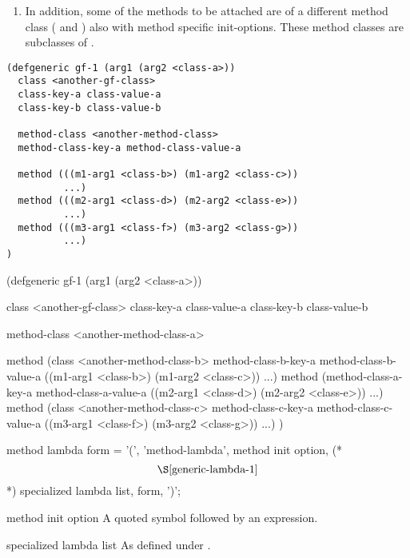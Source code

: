 \begin{optDefinition}
\begin{enumerate}
    \item In addition, some of the methods to be attached are of a different
    method class ( and
    ) also with method specific init-options.
    These method classes are subclasses of .
\end{enumerate}
%
\begin{optPrivate}
{\small\begin{verbatim}
(defgeneric gf-1 (arg1 (arg2 <class-a>))
  class <another-gf-class>
  class-key-a class-value-a
  class-key-b class-value-b

  method-class <another-method-class>
  method-class-key-a method-class-value-a

  method (((m1-arg1 <class-b>) (m1-arg2 <class-c>))
          ...)
  method (((m2-arg1 <class-d>) (m2-arg2 <class-e>))
          ...)
  method (((m3-arg1 <class-f>) (m3-arg2 <class-g>))
          ...)
)\end{verbatim}}
%
\end{optPrivate}
{\small\syntax
(defgeneric gf-1 (arg1 (arg2 <class-a>))

  class <another-gf-class>
  class-key-a class-value-a
  class-key-b class-value-b

  method-class <another-method-class-a>

  method (class <another-method-class-b>
          method-class-b-key-a method-class-b-value-a
          ((m1-arg1 <class-b>) (m1-arg2 <class-c>))
          ...)
  method (method-class-a-key-a method-class-a-value-a
          ((m2-arg1 <class-d>) (m2-arg2 <class-e>))
          ...)
  method (class <another-method-class-c>
          method-class-c-key-a method-class-c-value-a
          ((m3-arg1 <class-f>) (m3-arg2 <class-g>))
          ...)
)
\endsyntax}


\Syntax
\savesyntax\methodLambdaOneSyntax\vbox{\small\syntax
method lambda form
   = '(', 'method-lambda',
     {method init option}, (* \[\S\ref{generic-lambda-1}\] *)
     specialized lambda list,
     {form}, ')';
\endsyntax}
%
\begin{arguments}
    \item[method init option] A quoted symbol followed by an expression.

    \item[specialized lambda list] As defined under .


\end{arguments}
\end{optDefinition}
